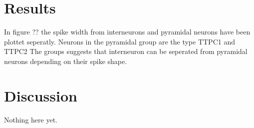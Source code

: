 \documentclass[altfont, fleqn]{uiophd}
\begin{document}



\chapter{Results}
In figure ?? the spike width from interneurons and pyramidal neurons have been
plottet seperatly. Neurons in the pyramidal group are the type TTPC1 and TTPC2 
The groups suggests that interneuron can be seperated from 
pyramidal neurons depending on their spike shape. 

\chapter{Discussion}
Nothing here yet.
\end{document}
